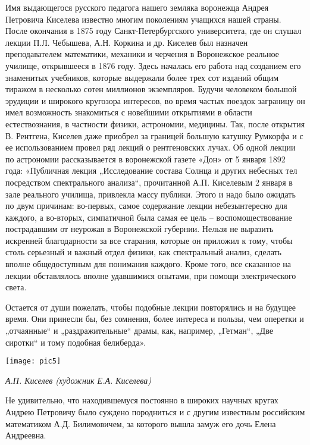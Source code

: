 Имя выдающегося русского педагога нашего земляка воронежца Андрея Петровича Киселева известно многим поколениям учащихся нашей страны. После окончания в 1875 году Санкт-Петербургского университета, где он слушал лекции П.Л. Чебышева, А.Н. Коркина и др. Киселев был назначен преподавателем математики, механики и черчения в Воронежское реальное училище, открывшееся в 1876 году. Здесь началась его работа над созданием его знаменитых учебников, которые выдержали более трех сот изданий общим тиражом в несколько сотен миллионов экземпляров. Будучи человеком большой эрудиции и широкого кругозора интересов, во время частых поездок заграницу он имел возможность знакомиться с новейшими открытиями в области естествознания, в частности физики, астрономии, медицины. Так, после открытия В. Рентгена, Киселев даже приобрел за границей большую катушку Румкорфа и с ее использованием провел ряд лекций о рентгеновских лучах. Об одной лекции по астрономии рассказывается в воронежской газете «Дон» от 5 января 1892 года: «Публичная лекция „Исследование состава Солнца и других небесных тел посредством спектрального анализа“, прочитанной А.П. Киселевым 2 января в зале реального училища, привлекла массу публики. Этого и надо было ожидать по двум причинам: во-первых, самое содержание лекции небезынтересно для каждого, а во-вторых, симпатичной была самая ее цель – воспомоществование пострадавшим от неурожая в Воронежской губернии. Нельзя не выразить искренней благодарности за все старания, которые он приложил к тому, чтобы столь серьезный и важный отдел физики, как спектральный анализ, сделать вполне общедоступным для понимания каждого. Кроме того, все сказанное на лекции обставлялось вполне удавшимися опытами, при помощи электрического света.

 Остается от души пожелать, чтобы подобные лекции повторялись и на будущее время. Они принесли бы, без сомнения, более интереса и пользы, чем оперетки и „отчаянные“ и „раздражительные“ драмы, как, например, „Гетман“, „Две сиротки“ и тому подобная белиберда».

\begin{center}
\texttt{[image: pic5]}

{\it А.П. Киселев (художник Е.А. Киселева)}
\end{center}


Не удивительно, что находившемуся постоянно в широких научных кругах Андрею Петровичу было суждено породниться и с другим известным российским математиком А.Д. Билимовичем, за которого вышла замуж его дочь Елена Андреевна.

